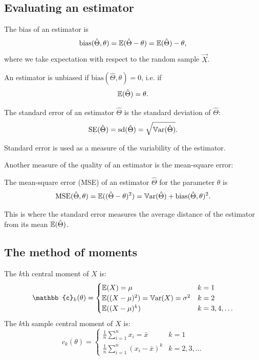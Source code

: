 \documentclass[10pt, a4paper]{article}
\begin{document}
\subsection{Evaluating an estimator}

\begin{definition}
    The bias of an estimator is
    \[
    \mathrm{bias}(\hat{\Theta}, \theta) = \mathbb{E}(\hat{\Theta} - \theta) = \mathbb{E}(\hat{\Theta}) - \theta,
    \]
    where we take expectation with respect to the random sample $\vec{X}$.

    An estimator is unbiased if $\mathrm{bias}(\hat{\Theta}, \theta) = 0$,
    i.e. if
    \[
    \mathbb{E}(\hat{\Theta}) = \theta.
    \]
\end{definition}

\begin{definition}
    The standard error of an estimator $\hat{\Theta}$ is the standard deviation of $\hat{\Theta}$:
    \[
    \mathrm{SE}(\hat{\Theta}) = \mathrm{sd}(\hat{\Theta}) = \sqrt{\mathbb{V}\mathrm{ar}(\hat{\Theta})}.
    \]
\end{definition}
Standard error is used as a measure of the variability of the estimator.

Another measure of the quality of an estimator is the mean-square error:
\begin{definition}
    The mean-square error
    (MSE)
    of an estimator $\hat{\Theta}$ for the parameter $\theta$ is
    \[
    \mathrm{MSE}(\hat{\Theta}, \theta) = \mathbb{E}((\hat{\Theta} - \theta) ^ 2) = \mathbb{V}\mathrm{ar}(\hat{\Theta}) + \mathrm{bias}(\hat{\Theta}, \theta) ^ 2.
    \]
\end{definition}
This is where the standard error measures the average distance of the estimator from its mean $\mathbb{E}(\hat{\Theta})$.

\subsection{The method of moments}

\begin{definition}
    The $k$th central moment of $X$ is:
    \[
    \mathbb{c}_k(\theta) = \begin{cases}
        \E(X) = \mu & k = 1 \\
        \E((X - \mu) ^ 2) = \Var(X) = \sigma ^ 2 & k = 2 \\
        \E((X - \mu) ^ k) & k = 3, 4, \dotsc
    \end{cases}
    \]
    The $k$th sample central moment of $X$ is:
    \[
    \hat{c}_k(\theta) = \begin{cases}
        \frac{1}{n}\sum_{i = 1}^{n}x_i = \bar{x} & k = 1 \\
        \frac{1}{n}\sum_{i = 1}^{n}(x_i - \bar{x}) ^ k & k = 2, 3, \dotsc
    \end{cases}
    \]
\end{definition}
\end{document}
